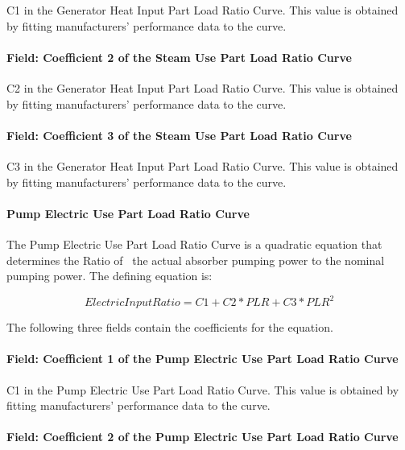 C1 in the Generator Heat Input Part Load Ratio Curve. This value is obtained by fitting manufacturers' performance data to the curve.

\paragraph{Field: Coefficient 2 of the Steam Use Part Load Ratio Curve}\label{field-coefficient-2-of-the-steam-use-part-load-ratio-curve}

C2 in the Generator Heat Input Part Load Ratio Curve. This value is obtained by fitting manufacturers' performance data to the curve.

\paragraph{Field: Coefficient 3 of the Steam Use Part Load Ratio Curve}\label{field-coefficient-3-of-the-steam-use-part-load-ratio-curve}

C3 in the Generator Heat Input Part Load Ratio Curve. This value is obtained by fitting manufacturers' performance data to the curve.

\paragraph{Pump Electric Use Part Load Ratio Curve}\label{pump-electric-use-part-load-ratio-curve}

The Pump Electric Use Part Load Ratio Curve is a quadratic equation that determines the Ratio of~ the actual absorber pumping power to the nominal pumping power. The defining equation is:

\begin{equation}
ElectricInputRatio = C1 + C2 * PLR + C3 * PL{R^2}
\end{equation}

The following three fields contain the coefficients for the equation.

\paragraph{Field: Coefficient 1 of the Pump Electric Use Part Load Ratio Curve}\label{field-coefficient-1-of-the-pump-electric-use-part-load-ratio-curve}

C1 in the Pump Electric Use Part Load Ratio Curve. This value is obtained by fitting manufacturers' performance data to the curve.

\paragraph{Field: Coefficient 2 of the Pump Electric Use Part Load Ratio Curve}\label{field-coefficient-2-of-the-pump-electric-use-part-load-ratio-curve}

